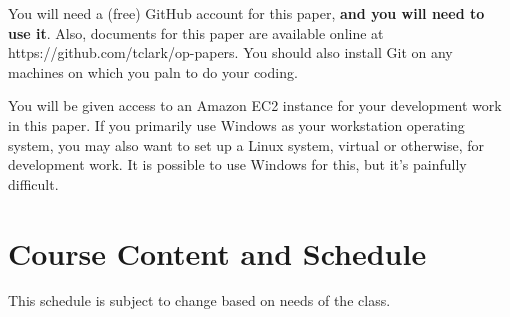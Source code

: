 \documentclass{article}
\begin{document}
You will need a (free) GitHub account for this paper, \textbf{and you will need to use it}.  Also, documents for this paper are available online at https://github.com/tclark/op-papers. You should also install Git on any machines on which you paln to do your coding.

You will be given access to an Amazon EC2 instance for your development work in this paper.  If you primarily use Windows as your workstation operating system, you may also want to set up a Linux system, virtual or otherwise, for development work.  It is possible to use Windows for this, but it's painfully difficult.

\newpage

\section*{Course Content and Schedule}
This schedule is subject to change based on needs of the class.
\end{document}
